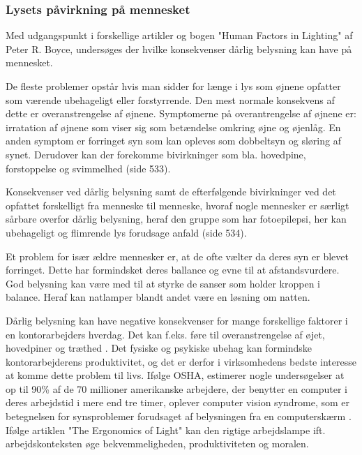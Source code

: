 \subsubsection{Lysets påvirkning på mennesket} 
\label{sec:konsekvenser}

Med udgangspunkt i forskellige artikler og bogen "Human Factors in Lighting" af Peter R. Boyce, undersøges der hvilke konsekvenser dårlig belysning kan have på mennesket. 

De fleste problemer opstår hvis man sidder for længe i lys som øjnene opfatter som værende ubehageligt eller forstyrrende. Den mest normale konsekvens af dette er overanstrengelse af øjnene. Symptomerne på overantrengelse af øjnene er: irratation af øjnene som viser sig som betændelse omkring øjne og øjenlåg. En anden symptom er forringet syn som kan opleves som dobbeltsyn og sløring af synet. Derudover kan der forekomme bivirkninger som bla. hovedpine, forstoppelse og svimmelhed \cite{human_factors}(side 533).

Konsekvenser ved dårlig belysning samt de efterfølgende bivirkninger ved det opfattet forskelligt fra menneske til menneske, hvoraf nogle mennesker er særligt sårbare overfor dårlig belysning, heraf den gruppe som har fotoepilepsi, her kan ubehageligt og flimrende lys forudsage anfald \cite{human_factors}(side 534). 

Et problem for især ældre mennesker er, at de ofte vælter da deres syn er blevet forringet. Dette har formindsket deres ballance og evne til at afstandsvurdere. God belysning kan være med til at styrke de sanser som holder kroppen i balance. Heraf kan natlamper blandt andet være en løsning om natten. 

Dårlig belysning kan have negative konsekvenser for mange forskellige faktorer i en kontorarbejders hverdag. Det kan f.eks. føre til overanstrengelse af øjet, hovedpiner og træthed \cite{ergonomi_arbejdsplads}. Det fysiske og psykiske ubehag kan formindske kontorarbejderens produktivitet, og det er derfor i virksomhedens bedste interesse at komme dette problem til livs. Ifølge OSHA, estimerer nogle undersøgelser at op til 90\% af de 70 millioner amerikanske arbejdere, der benytter en computer i deres arbejdstid i mere end tre timer, oplever computer vision syndrome, som er betegnelsen for synsproblemer forudsaget af belysningen fra en computerskærm \cite{CVS}. Ifølge artiklen "The Ergonomics of Light" kan den rigtige arbejdslampe ift. arbejdskonteksten øge bekvemmeligheden, produktiviteten og moralen\cite{ergonomi_arbejdsplads}. 